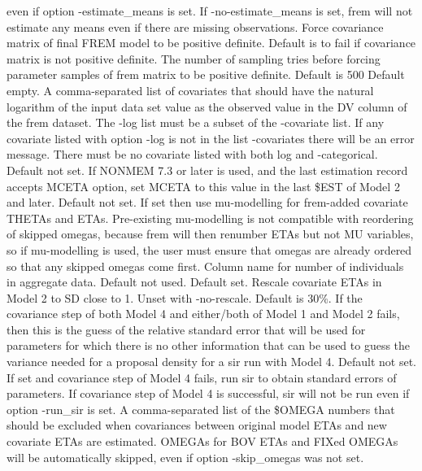 \begin{optionlist}
even if option -estimate\_means is set. If -no-estimate\_means is set, frem will not estimate
any means even if there are missing observations.
\nextopt
{}
    Force covariance matrix of final FREM model to be positive definite.
    Default is to fail if covariance matrix is not positive definite.
\nextopt
{}
    The number of sampling tries before forcing parameter samples of frem matrix to be positive definite.
    Default is 500
\nextopt
{}
Default empty. A comma-separated list of covariates	that should have the natural logarithm of the input data
set value as the observed value in the DV column of the frem dataset. The -log list must be a subset of the
-covariate list. If any covariate listed with option -log is not in the list -covariates there will be an
error message. There must be no covariate listed with both log and -categorical.
\nextopt
{}
Default not set. If NONMEM 7.3 or later is used, and the last estimation record accepts MCETA option, set MCETA to this value
in the last \$EST of Model 2 and later.
\nextopt
{}
Default not set. If set then use mu-modelling for frem-added covariate THETAs and ETAs. Pre-existing
mu-modelling is not compatible with reordering of skipped omegas, because frem will then renumber ETAs
but not MU variables, so if mu-modelling is used, the user must ensure that omegas are already ordered
so that any skipped omegas come first.
\nextopt
{}
Column name for number of individuals in aggregate data. Default not used.
\nextopt
{}
Default set. Rescale covariate ETAs in Model 2 to SD close to 1. Unset with -no-rescale.
\nextopt
{}
Default is 30\%.
If the covariance step of both Model 4 and either/both of Model 1 and Model 2 fails, then this is the guess of the
relative standard error that will be used for parameters for which there is no other information that can be used
to guess the variance needed for a proposal density for a sir run with Model 4.
\nextopt
{}
Default not set. If set and covariance step of Model 4 fails, run sir to obtain standard errors of parameters.
If covariance step of Model 4 is successful, sir will not be run even if option -run\_sir is set.
\nextopt
{}
A comma-separated list of the \$OMEGA numbers that should be excluded when covariances
between original model ETAs and new covariate ETAs are estimated.
OMEGAs for BOV ETAs and FIXed OMEGAs will be automatically skipped,
even if option -skip\_omegas was not set.
\nextopt
\end{optionlist}


